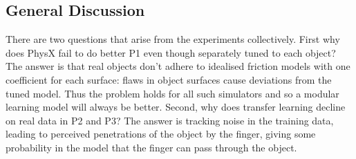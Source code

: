 \subsection{General Discussion} 

There are two questions that arise from the experiments collectively. First why does PhysX fail to do better P1 even though separately tuned to each object? The answer is that real objects don't adhere to idealised friction models with one coefficient for each surface: flaws in object surfaces cause deviations from the tuned model. Thus the problem holds for all such simulators and so a modular learning model will always be better. Second, why does transfer learning decline on real data in P2 and P3? The answer is tracking noise in the training data, leading to perceived penetrations of the object by the finger, giving some probability in the model that the finger can pass through the object. 















